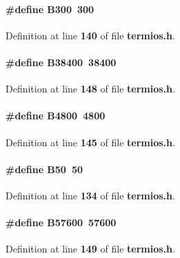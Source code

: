 \paragraph[{B300}]{\setlength{\rightskip}{0pt plus 5cm}\#define B300~300}\label{termios_8h_a573c6a21141c17da9298fa7ca56d6c33}


Definition at line {\bf 140} of file {\bf termios.\+h}.

\paragraph[{B38400}]{\setlength{\rightskip}{0pt plus 5cm}\#define B38400~38400}\label{termios_8h_ab282ae5b7fb59155ee42d1b6c9a80683}


Definition at line {\bf 148} of file {\bf termios.\+h}.

\paragraph[{B4800}]{\setlength{\rightskip}{0pt plus 5cm}\#define B4800~4800}\label{termios_8h_a3b0ce0abd5ad4af8d485c843c9bab66c}


Definition at line {\bf 145} of file {\bf termios.\+h}.

\paragraph[{B50}]{\setlength{\rightskip}{0pt plus 5cm}\#define B50~50}\label{termios_8h_ab4b3af8b2e252133f4c439e937c0f7cc}


Definition at line {\bf 134} of file {\bf termios.\+h}.

\paragraph[{B57600}]{\setlength{\rightskip}{0pt plus 5cm}\#define B57600~57600}\label{termios_8h_a4bde6a10c31adfe1959fb9724e13029a}


Definition at line {\bf 149} of file {\bf termios.\+h}.

